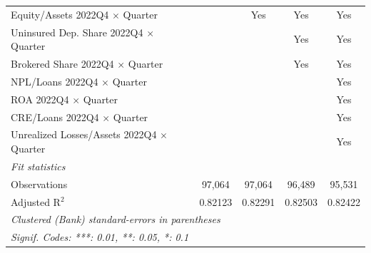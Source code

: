 \begin{tabular}{lcccc}
   Equity/Assets 2022Q4 $\times$ Quarter          &                 & Yes             & Yes             & Yes\\  
   Uninsured Dep. Share 2022Q4 $\times$ Quarter       &                 &                 & Yes             & Yes\\  
   Brokered Share 2022Q4 $\times$ Quarter         &                 &                 & Yes             & Yes\\  
   NPL/Loans 2022Q4 $\times$ Quarter              &                 &                 &                 & Yes\\  
   ROA 2022Q4 $\times$ Quarter                     &                 &                 &                 & Yes\\  
   CRE/Loans 2022Q4 $\times$ Quarter       &                 &                 &                 & Yes\\  
   Unrealized Losses/Assets 2022Q4 $\times$ Quarter    &                 &                 &                 & Yes\\  
   \midrule
   \emph{Fit statistics}\\
   Observations                            & 97,064          & 97,064          & 96,489          & 95,531\\  
   Adjusted R$^2$                          & 0.82123         & 0.82291         & 0.82503         & 0.82422\\  
   \midrule \midrule
   \multicolumn{5}{l}{\emph{Clustered (Bank) standard-errors in parentheses}}\\
   \multicolumn{5}{l}{\emph{Signif. Codes: ***: 0.01, **: 0.05, *: 0.1}}\\
\end{tabular}
\par\endgroup


